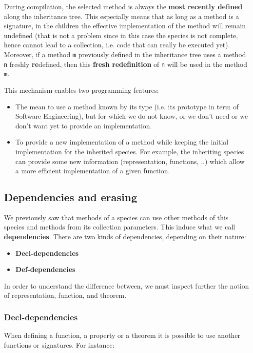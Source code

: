 During compilation, the selected method is always the {\bf most
recently defined} along the inheritance tree. This especially means
that as long as a method is a signature, in the children the effective
implementation of the method will remain undefined (that is not a
problem since in this case the species is not complete, hence cannot
lead to a collection, i.e. code that can really be executed
yet). Moreover, if a method {\tt m} previously defined in the
inheritance tree uses a method {\tt n} freshly {\bf re}defined, then
this {\bf fresh redefinition} of {\tt n} will be used in the method
{\tt m}.

\smallskip
This mechanism enables two programming features:
\begin{itemize}
  \item The mean to use a method known by its type (i.e. its prototype
    in term of Software Engineering), but for which we do not know, or
    we don't need or we don't want yet to provide an implementation.

  \item To provide a new implementation of a method while  keeping the
    initial implementation for the inherited species. For example, the
    inheriting species can provide some new information
    (representation, functions, ..) which allow a more efficient
    implementation of a given function.
\end{itemize}



\subsection{Dependencies and erasing}\label{dependencies}
We previously saw that methods of a species can use other methods of
this species and methods from its collection parameters. This induce
what we call {\bf dependencies}. There are two kinds
of dependencies, depending on their nature:
\begin{itemize}
  \item {\bf Decl-dependencies}
  \item {\bf Def-dependencies}
\end{itemize}
In order to understand the difference between, we must inspect further
the notion of representation, function, and theorem.



\subsubsection{Decl-dependencies}
When defining a function, a property or a theorem it is possible to
use another functions or signatures. For instance:

